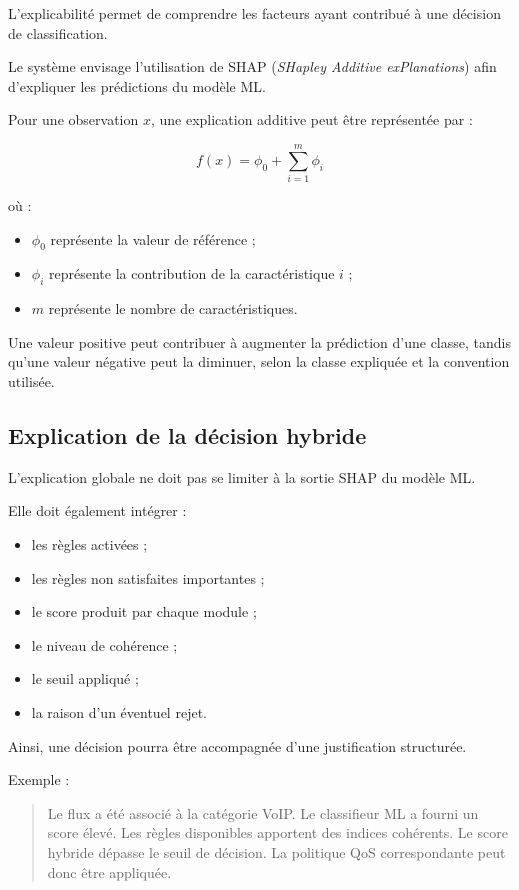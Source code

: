 L'explicabilité permet de comprendre les facteurs
ayant contribué à une décision de classification.

Le système envisage l'utilisation de SHAP
(\textit{SHapley Additive exPlanations}) afin
d'expliquer les prédictions du modèle ML.

Pour une observation $x$, une explication additive
peut être représentée par :

\[
f(x)=\phi_0+\sum_{i=1}^{m}\phi_i
\]

où :

\begin{itemize}
    \item $\phi_0$ représente la valeur de référence ;
    \item $\phi_i$ représente la contribution de
    la caractéristique $i$ ;
    \item $m$ représente le nombre de caractéristiques.
\end{itemize}

Une valeur positive peut contribuer à augmenter
la prédiction d'une classe, tandis qu'une valeur
négative peut la diminuer, selon la classe expliquée
et la convention utilisée.

\subsection{Explication de la décision hybride}

L'explication globale ne doit pas se limiter
à la sortie SHAP du modèle ML.

Elle doit également intégrer :

\begin{itemize}
    \item les règles activées ;
    \item les règles non satisfaites importantes ;
    \item le score produit par chaque module ;
    \item le niveau de cohérence ;
    \item le seuil appliqué ;
    \item la raison d'un éventuel rejet.
\end{itemize}

Ainsi, une décision pourra être accompagnée
d'une justification structurée.

Exemple :

\begin{quote}
Le flux a été associé à la catégorie VoIP.
Le classifieur ML a fourni un score élevé.
Les règles disponibles apportent des indices cohérents.
Le score hybride dépasse le seuil de décision.
La politique QoS correspondante peut donc être appliquée.
\end{quote}

